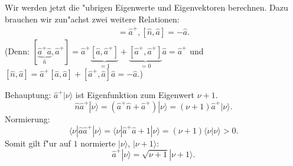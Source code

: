 Wir werden jetzt die "ubrigen Eigenwerte und Eigenvektoren berechnen. Dazu brauchen wir zun"achst zwei weitere
Relationen:
\begin{align}
	[\hat n, \hat a^+] = \hat a^+,
	[\hat n, \hat a]=-\hat a.
\end{align}
(Denn: $[\underbrace{\hat a^+\hat a}_{\hat n}, \hat a^+] = \hat a^+ \underbrace{[\hat a, \hat a^+]}_{=1} + 
\underbrace{[\hat a^+,\hat a^+]}_{=0} \hat a = \hat a^+$ und 
$[\hat n, \hat a] = \hat a^+ [\hat a, \hat a] + [\hat a^+, \hat a]\hat a=-\hat a$.)

Behauptung: $\hat a^+ |\nu \rangle$ ist Eigenfunktion zum Eigenwert $\nu+1$.
\begin{equation}
	\hat n \hat a^+ |\nu\rangle = (\hat a^+ \hat n + \hat a^+) |\nu\rangle = (\nu+1)\hat a^+ |\nu\rangle.
\end{equation}
Normierung: 
\begin{equation}
	\langle \nu| \hat a \hat a^+|\nu\rangle = \langle \nu|\hat a^+ \hat a + 1|\nu \rangle=
	(\nu+1) \langle \nu|\nu \rangle >0.
\end{equation}
Somit gilt f"ur auf $1$ normierte $|\nu\rangle$, $|\nu+1\rangle$: 
\begin{equation}
	\hat a^+ |\nu\rangle = \sqrt{\nu+1} |\nu+1\rangle.
\end{equation}

